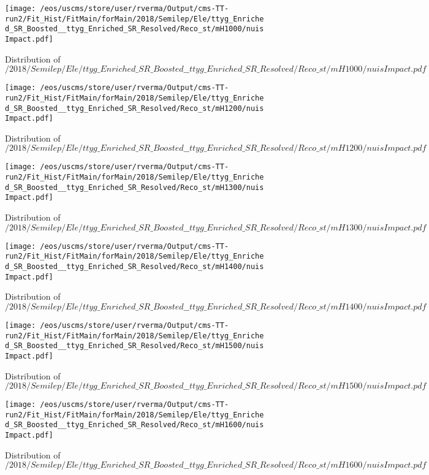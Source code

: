 \begin{figure}
\centering
\texttt{[image: /eos/uscms/store/user/rverma/Output/cms-TT-run2/Fit\_Hist/FitMain/forMain/2018/Semilep/Ele/ttyg\_Enriched\_SR\_Boosted\_\_ttyg\_Enriched\_SR\_Resolved/Reco\_st/mH1000/nuisImpact.pdf]}
\caption{Distribution of $/2018/Semilep/Ele/ttyg\_Enriched\_SR\_Boosted\_\_ttyg\_Enriched\_SR\_Resolved/Reco\_st/mH1000/nuisImpact.pdf$}
\end{figure}

\begin{figure}
\centering
\texttt{[image: /eos/uscms/store/user/rverma/Output/cms-TT-run2/Fit\_Hist/FitMain/forMain/2018/Semilep/Ele/ttyg\_Enriched\_SR\_Boosted\_\_ttyg\_Enriched\_SR\_Resolved/Reco\_st/mH1200/nuisImpact.pdf]}
\caption{Distribution of $/2018/Semilep/Ele/ttyg\_Enriched\_SR\_Boosted\_\_ttyg\_Enriched\_SR\_Resolved/Reco\_st/mH1200/nuisImpact.pdf$}
\end{figure}

\begin{figure}
\centering
\texttt{[image: /eos/uscms/store/user/rverma/Output/cms-TT-run2/Fit\_Hist/FitMain/forMain/2018/Semilep/Ele/ttyg\_Enriched\_SR\_Boosted\_\_ttyg\_Enriched\_SR\_Resolved/Reco\_st/mH1300/nuisImpact.pdf]}
\caption{Distribution of $/2018/Semilep/Ele/ttyg\_Enriched\_SR\_Boosted\_\_ttyg\_Enriched\_SR\_Resolved/Reco\_st/mH1300/nuisImpact.pdf$}
\end{figure}

\begin{figure}
\centering
\texttt{[image: /eos/uscms/store/user/rverma/Output/cms-TT-run2/Fit\_Hist/FitMain/forMain/2018/Semilep/Ele/ttyg\_Enriched\_SR\_Boosted\_\_ttyg\_Enriched\_SR\_Resolved/Reco\_st/mH1400/nuisImpact.pdf]}
\caption{Distribution of $/2018/Semilep/Ele/ttyg\_Enriched\_SR\_Boosted\_\_ttyg\_Enriched\_SR\_Resolved/Reco\_st/mH1400/nuisImpact.pdf$}
\end{figure}

\begin{figure}
\centering
\texttt{[image: /eos/uscms/store/user/rverma/Output/cms-TT-run2/Fit\_Hist/FitMain/forMain/2018/Semilep/Ele/ttyg\_Enriched\_SR\_Boosted\_\_ttyg\_Enriched\_SR\_Resolved/Reco\_st/mH1500/nuisImpact.pdf]}
\caption{Distribution of $/2018/Semilep/Ele/ttyg\_Enriched\_SR\_Boosted\_\_ttyg\_Enriched\_SR\_Resolved/Reco\_st/mH1500/nuisImpact.pdf$}
\end{figure}

\begin{figure}
\centering
\texttt{[image: /eos/uscms/store/user/rverma/Output/cms-TT-run2/Fit\_Hist/FitMain/forMain/2018/Semilep/Ele/ttyg\_Enriched\_SR\_Boosted\_\_ttyg\_Enriched\_SR\_Resolved/Reco\_st/mH1600/nuisImpact.pdf]}
\caption{Distribution of $/2018/Semilep/Ele/ttyg\_Enriched\_SR\_Boosted\_\_ttyg\_Enriched\_SR\_Resolved/Reco\_st/mH1600/nuisImpact.pdf$}
\end{figure}

